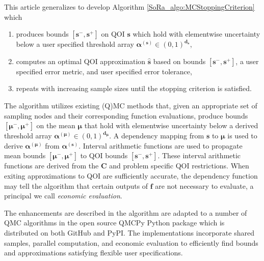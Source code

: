 \documentclass[graybox]{svmult}
\begin{document}
This article generalizes \cite{adaptive_qmc} to develop Algorithm \ref{SoRa_algo:MCStoppingCriterion} which 
\begin{enumerate}
    \item produces bounds $[\boldsymbol{s}^-,\boldsymbol{s}^+]$ on QOI $\boldsymbol{s}$ which hold with elementwise uncertainty below a user specified threshold array $\boldsymbol{\alpha}^{(\boldsymbol{s})} \in (0,1)^{\boldsymbol{d}_{\boldsymbol{s}}}$, 
    \item computes an optimal QOI approximation $\hat{\boldsymbol{s}}$ based on bounds $[\boldsymbol{s}^-,\boldsymbol{s}^+]$, a user specified error metric, and user specified error tolerance,
    \item repeats with increasing sample sizes until the stopping criterion is satisfied. 
\end{enumerate}
The algorithm utilizes existing (Q)MC methods that, given an appropriate set of sampling nodes and their corresponding function evaluations, produce bounds $[\boldsymbol{\mu}^-,\boldsymbol{\mu}^+]$ on the mean $\boldsymbol{\mu}$ that hold with elementwise uncertainty below a derived threshold array $\boldsymbol{\alpha}^{(\boldsymbol{\mu})} \in (0,1)^{\boldsymbol{d}_{\boldsymbol{\mu}}}$. A dependency mapping from $\boldsymbol{s}$ to $\boldsymbol{\mu}$ is used to derive $\boldsymbol{\alpha}^{(\boldsymbol{\mu})}$ from $\boldsymbol{\alpha}^{(\boldsymbol{s})}$. Interval arithmetic functions are used to propagate mean bounds $[\boldsymbol{\mu}^-,\boldsymbol{\mu}^+]$ to QOI bounds $[\boldsymbol{s}^-,\boldsymbol{s}^+]$. These interval arithmetic functions are derived from the $\boldsymbol{C}$ and problem specific QOI restrictions. When exiting approximations to QOI are sufficiently accurate, the dependency function may tell the algorithm that certain outputs of $\boldsymbol{f}$ are not necessary to evaluate, a principal we call \emph{economic evaluation}. 

The enhancements are described in the algorithm are adapted to a number of QMC algorithms in the open source QMCPy Python package \cite{QMCPy} which is distributed on both GitHub and PyPI. The implementations incorporate shared samples, parallel computation, and economic evaluation to efficiently find bounds and approximations satisfying flexible user specifications.
\end{document}
